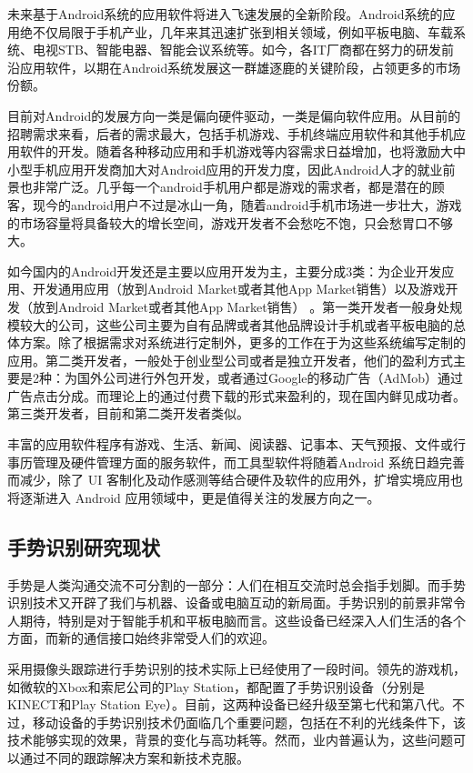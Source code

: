 \documentclass{XDBAthesis}
\begin{document}
未来基于Android系统的应用软件将进入飞速发展的全新阶段。Android系统的应用绝不仅局限于手机产业，几年来其迅速扩张到相关领域，例如平板电脑、车载系统、电视STB、智能电器、智能会议系统等。如今，各IT厂商都在努力的研发前沿应用软件，以期在Android系统发展这一群雄逐鹿的关键阶段，占领更多的市场份额。

目前对Android的发展方向一类是偏向硬件驱动，一类是偏向软件应用\cite{张建平2013基于}。从目前的招聘需求来看，后者的需求最大，包括手机游戏、手机终端应用软件和其他手机应用软件的开发。随着各种移动应用和手机游戏等内容需求日益增加，也将激励大中小型手机应用开发商加大对Android应用的开发力度，因此Android人才的就业前景也非常广泛。几乎每一个android手机用户都是游戏的需求者，都是潜在的顾客，现今的android用户不过是冰山一角，随着android手机市场进一步壮大，游戏的市场容量将具备较大的增长空间，游戏开发者不会愁吃不饱，只会愁胃口不够大。

如今国内的Android开发还是主要以应用开发为主，主要分成3类：为企业开发应用、开发通用应用（放到Android Market或者其他App Market销售）以及游戏开发（放到Android Market或者其他App Market销售）\cite{许瑾2011基于} 。第一类开发者一般身处规模较大的公司，这些公司主要为自有品牌或者其他品牌设计手机或者平板电脑的总体方案。除了根据需求对系统进行定制外，更多的工作在于为这些系统编写定制的应用。第二类开发者，一般处于创业型公司或者是独立开发者，他们的盈利方式主要是2种：为国外公司进行外包开发，或者通过Google的移动广告（AdMob）通过广告点击分成。而理论上的通过付费下载的形式来盈利的，现在国内鲜见成功者。第三类开发者，目前和第二类开发者类似。

丰富的应用软件程序有游戏、生活、新闻、阅读器、记事本、天气预报、文件或行事历管理及硬件管理方面的服务软件，而工具型软件将随着Android 系统日趋完善而减少，除了 UI 客制化及动作感测等结合硬件及软件的应用外，扩增实境应用也将逐渐进入 Android 应用领域中，更是值得关注的发展方向之一。

\subsection{手势识别研究现状}

手势是人类沟通交流不可分割的一部分：人们在相互交流时总会指手划脚。而手势识别技术又开辟了我们与机器、设备或电脑互动的新局面。手势识别的前景非常令人期待，特别是对于智能手机和平板电脑而言。这些设备已经深入人们生活的各个方面，而新的通信接口始终非常受人们的欢迎。

采用摄像头跟踪进行手势识别的技术实际上已经使用了一段时间。领先的游戏机，如微软的Xbox和索尼公司的Play Station，都配置了手势识别设备（分别是KINECT和Play Station Eye）。目前，这两种设备已经升级至第七代和第八代。不过，移动设备的手势识别技术仍面临几个重要问题，包括在不利的光线条件下，该技术能够实现的效果，背景的变化与高功耗等。然而，业内普遍认为，这些问题可以通过不同的跟踪解决方案和新技术克服。
\end{document}
